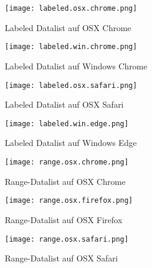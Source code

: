 \begin{figure}[!htb]
    \centering
    \begin{minipage}[b]{0.45\textwidth}
        \centering
        \texttt{[image: labeled.osx.chrome.png]}
        \caption{\centering Labeled Datalist auf OSX Chrome}
        \label{img:labeledOsxChromeDatalist}
    \end{minipage}
    \hfill
    \begin{minipage}[b]{0.45\textwidth}
        \centering
        \texttt{[image: labeled.win.chrome.png]}
        \caption{\centering Labeled Datalist auf Windows Chrome}
        \label{img:labeledWinChromeDatalist}
    \end{minipage}
\end{figure}

\begin{figure}[!htb]
    \centering
    \begin{minipage}[b]{0.45\textwidth}
        \centering
        \texttt{[image: labeled.osx.safari.png]}
        \caption{\centering Labeled Datalist auf OSX Safari}
        \label{img:labeledOsxSafariDatalist}
    \end{minipage}
    \hfill
    \begin{minipage}[b]{0.45\textwidth}
        \centering
        \texttt{[image: labeled.win.edge.png]}
        \caption{\centering Labeled Datalist auf Windows Edge}
        \label{img:labeledWinEdgeDatalist}
    \end{minipage}
\end{figure}


\begin{figure}[!htb]
    \centering
    \begin{minipage}[b]{0.28\textwidth}
        \centering
        \texttt{[image: range.osx.chrome.png]}
        \caption{\centering Range-Datalist auf OSX Chrome}
        \label{img:rangeOsxChromeDatalist}
    \end{minipage}
    \hfill
    \begin{minipage}[b]{0.28\textwidth}
        \centering
        \texttt{[image: range.osx.firefox.png]}
        \caption{\centering Range-Datalist auf OSX Firefox}
        \label{img:rangeOsxFirefoxDatalist}
    \end{minipage}
    \hfill
    \begin{minipage}[b]{0.28\textwidth}
        \centering
        \texttt{[image: range.osx.safari.png]}
        \caption{\centering Range-Datalist auf OSX Safari}
        \label{img:rangeOsxSafariDatalist}
    \end{minipage}
\end{figure}

